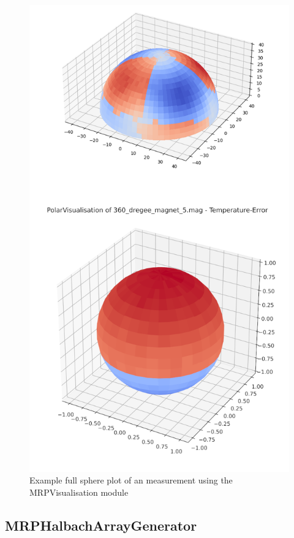 \begin{figure}
\centering
\includegraphics{./generated_images/border_Example_full_sphere_plot_of_an_measurement_using_the_MRPVisualisation_module.png}
\caption{Example full sphere plot of an measurement using the
MRPVisualisation module
\label{Example_full_sphere_plot_of_an_measurement_using_the_MRPVisualisation_module.png}}
\end{figure}

\hypertarget{mrphalbacharraygenerator}{%
\subsection{MRPHalbachArrayGenerator}\label{mrphalbacharraygenerator}}

